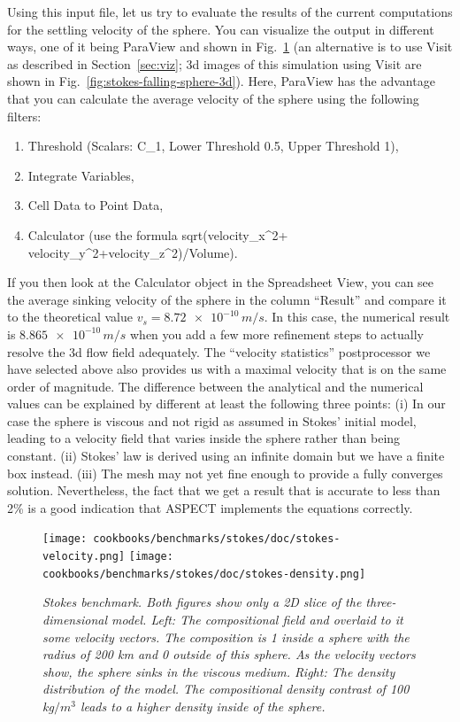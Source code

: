 \documentclass{article}
\newcommand{\aspect}{\textsc{ASPECT}}
\begin{document}
Using this input file, let us try to evaluate the results of the current
computations for the settling velocity of the sphere. You can visualize the output in different
ways, one of it being ParaView and shown in
Fig.~\ref{fig:stokes-falling-sphere-2d} (an alternative is to use Visit as
described in Section~\ref{sec:viz}; 3d images of this simulation using Visit
are shown in Fig.~\ref{fig:stokes-falling-sphere-3d}).
Here, ParaView has the advantage that you can calculate the average velocity
of the sphere using the following filters:
\begin{enumerate}
 \item Threshold (Scalars: C\_1, Lower Threshold 0.5, Upper Threshold 1),
 \item Integrate Variables,
 \item Cell Data to Point Data,
 \item Calculator (use the formula sqrt(velocity\_x\textasciicircum2+
       velocity\_y\textasciicircum2+velocity\_z\textasciicircum2)/Volume).
\end{enumerate}
If you then look at
the Calculator object in the Spreadsheet View, you can see the average sinking
velocity of the sphere in the column ``Result'' and compare it to the theoretical
value $v_s = \num{8.72e-10} \, \si{m}/\si{s}$.
In this case, the numerical result is $\num{8.865e-10} \,
\si{m}/\si{s}$ when you add a few more refinement steps to actually resolve
the 3d flow field adequately. The ``velocity statistics'' postprocessor we have
selected above also provides us with a maximal velocity that is on the same
order of magnitude. The difference between the analytical and the numerical
values can be explained by different at least the following three points:
(i) In our case the sphere is viscous and not rigid as assumed in Stokes' initial model, leading to
a velocity field that varies inside the sphere rather than being constant.
(ii) Stokes' law is derived using an infinite domain but we have a finite box
instead. (iii) The mesh may not yet fine enough to provide a fully converges
solution. Nevertheless, the fact that we get a result that is accurate to less
than 2\% is a good indication that \aspect{} implements the equations correctly.

\begin{figure}
  \begin{center}
    \texttt{[image: cookbooks/benchmarks/stokes/doc/stokes-velocity.png]}
    \hfill
    \texttt{[image: cookbooks/benchmarks/stokes/doc/stokes-density.png]}
  \end{center}
  \caption{\it Stokes benchmark. Both figures show only a 2D slice of the
      three-dimensional model.
      Left: The compositional field and overlaid to it some velocity vectors.
      The composition is 1 inside a sphere with the radius of 200 km and 0
      outside of this sphere. As the velocity vectors show, the sphere sinks
      in the viscous medium.
      Right: The density distribution of the model. The compositional density
      contrast of 100 kg$/\si{m}^3$ leads to a higher density inside of the
      sphere.}
  \label{fig:stokes-falling-sphere-2d}
\end{figure}
\end{document}
